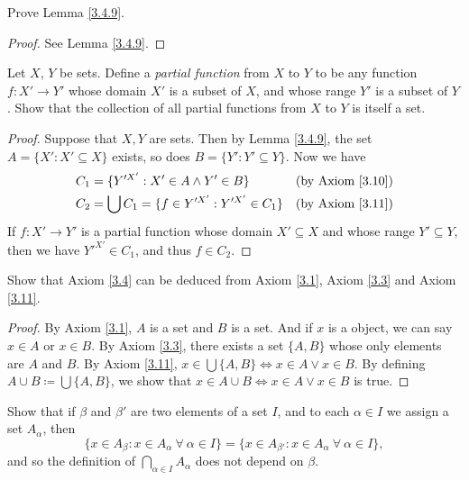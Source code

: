 \begin{exercise}\label{ex 3.4.6}
Prove Lemma \ref{3.4.9}.
\end{exercise}

\begin{proof}
See Lemma \ref{3.4.9}.
\end{proof}

\begin{exercise}\label{ex 3.4.7}
Let \(X\), \(Y\) be sets.
Define a \emph{partial function} from \(X\) to \(Y\) to be any function \(f : X' \to Y'\) whose domain \(X'\) is a subset of \(X\), and whose range \(Y'\) is a subset of \(Y\).
Show that the collection of all partial functions from \(X\) to \(Y\) is itself a set.
\end{exercise}

\begin{proof}
Suppose that \(X, Y\) are sets.
Then by Lemma \ref{3.4.9}, the set \(A = \{X' : X' \subseteq X\}\) exists, so does \(B = \{Y' : Y' \subseteq Y\}\).
Now we have
\begin{align*}
C_1 &= \{Y'^{X'} : X' \in A \land Y' \in B\} & \text{(by Axiom \ref{3.10})} \\
C_2 &= \bigcup C_1 = \{f \in Y'^{X'} : Y'^{X'} \in C_1\} & \text{(by Axiom \ref{3.11})} \\
\end{align*}
If \(f : X' \to Y'\) is a partial function whose domain \(X' \subseteq X\) and whose range \(Y' \subseteq Y\), then we have \(Y'^{X'} \in C_1\), and thus \(f \in C_2\).
\end{proof}

\begin{exercise}\label{ex 3.4.8}
Show that Axiom \ref{3.4} can be deduced from Axiom \ref{3.1}, Axiom \ref{3.3} and Axiom \ref{3.11}.
\end{exercise}

\begin{proof}
By Axiom \ref{3.1}, \(A\) is a set and \(B\) is a set.
And if \(x\) is a object, we can say \(x \in A\) or \(x \in B\).
By Axiom \ref{3.3}, there exists a set \(\{A, B\}\) whose only elements are \(A\) and \(B\).
By Axiom \ref{3.11}, \(x \in \bigcup \{A, B\} \iff x \in A \lor x \in B\).
By defining \(A \cup B \coloneqq \bigcup \{A, B\}\), we show that \(x \in A \cup B \iff x \in A \lor x \in B\) is true.
\end{proof}

\begin{exercise}\label{ex 3.4.9}
Show that if \(\beta\) and \(\beta'\) are two elements of a set \(I\), and to each \(\alpha \in I\) we assign a set \(A_{\alpha}\), then
\[
    \{x \in A_{\beta} : x \in A_{\alpha} \ \forall\ \alpha \in I\} = \{x \in A_{\beta'} : x \in A_{\alpha} \ \forall\ \alpha \in I\},
\]
and so the definition of \(\bigcap_{\alpha \in I} A_{\alpha}\) does not depend on \(\beta\).
\end{exercise}

